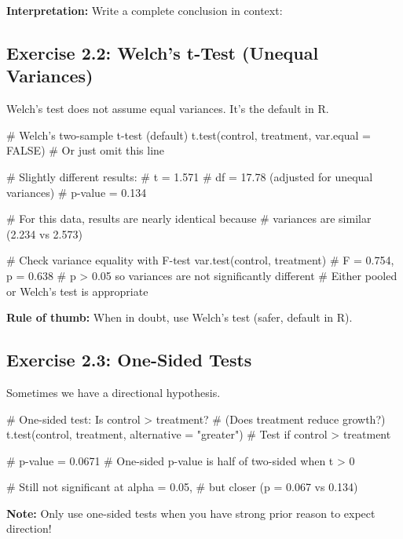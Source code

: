 \documentclass[11pt]{article}
\begin{document}
\textbf{Interpretation:} Write a complete conclusion in context:

\vspace{2cm}

\subsection{Exercise 2.2: Welch's t-Test (Unequal Variances)}

Welch's test does not assume equal variances. It's the default in R.

\begin{rcode}
# Welch's two-sample t-test (default)
t.test(control, treatment,
       var.equal = FALSE)  # Or just omit this line

# Slightly different results:
# t = 1.571
# df = 17.78 (adjusted for unequal variances)
# p-value = 0.134

# For this data, results are nearly identical because
# variances are similar (2.234 vs 2.573)

# Check variance equality with F-test
var.test(control, treatment)
# F = 0.754, p = 0.638
# p > 0.05 so variances are not significantly different
# Either pooled or Welch's test is appropriate
\end{rcode}

\textbf{Rule of thumb:} When in doubt, use Welch's test (safer, default in R).

\vspace{1cm}

\subsection{Exercise 2.3: One-Sided Tests}

Sometimes we have a directional hypothesis.

\begin{rcode}
# One-sided test: Is control > treatment?
# (Does treatment reduce growth?)
t.test(control, treatment,
       alternative = "greater")  # Test if control > treatment

# p-value = 0.0671
# One-sided p-value is half of two-sided when t > 0

# Still not significant at alpha = 0.05,
# but closer (p = 0.067 vs 0.134)
\end{rcode}

\textbf{Note:} Only use one-sided tests when you have strong prior reason to expect direction!

\vspace{1cm}
\end{document}
